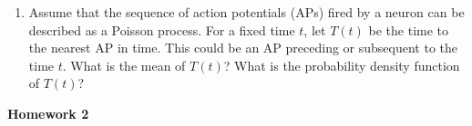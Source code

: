 \documentclass[12pt]{article}
\begin{document}
\begin{enumerate}
{\bf Comment:} \emph{This problem can be extended to provide a more realistic model of this process by,
for example,  including a probability that the protein will bind to the region of DNA.}


\item Assume that the sequence of action potentials (APs) fired by a neuron can be described as a Poisson process.
For a fixed time $t$, let $T(t)$ be the time to the nearest AP in time.  This could be an AP
preceding or subsequent to the time $t$.   What is the mean of $T(t)$?  What is the probability density function of $T(t)$?

\end{enumerate}



\begin{center}
{\Large \bf Homework 2
\\ \vskip5mm }
\end{center}

\vskip5mm 
\end{document}
